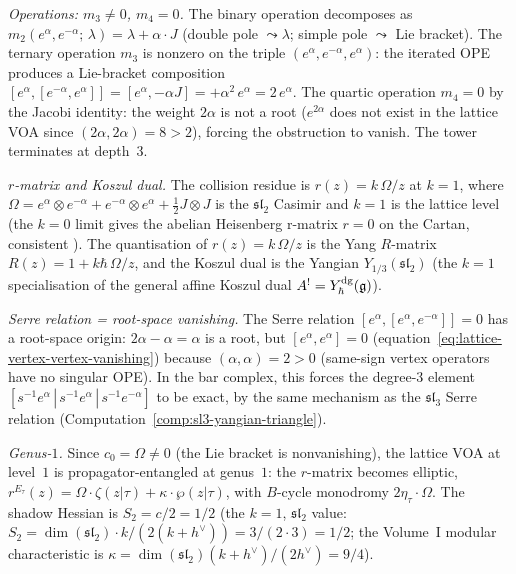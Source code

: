 \begin{computation}
\smallskip
\noindent
\emph{Operations: $m_3 \ne 0$, $m_4 = 0$.}
The binary operation decomposes as
$m_2(e^\alpha, e^{-\alpha};\, \lambda)
= \lambda + \alpha \cdot J$
(double pole $\leadsto \lambda$; simple pole $\leadsto$ Lie bracket).
The ternary operation $m_3$ is nonzero on the triple
$(e^\alpha, e^{-\alpha}, e^\alpha)$: the iterated OPE
produces a Lie-bracket composition
$[e^\alpha, [e^{-\alpha}, e^\alpha]] = [e^\alpha, -\alpha J]
= +\alpha^2\, e^\alpha = 2\, e^\alpha$.
The quartic operation $m_4 = 0$ by the Jacobi identity:
the weight $2\alpha$ is not a root
($e^{2\alpha}$ does not exist in the lattice VOA
since $(2\alpha, 2\alpha) = 8 > 2$), forcing the
obstruction to vanish. The tower terminates at depth~$3$.

\smallskip
\noindent
\emph{$r$-matrix and Koszul dual.}
The collision residue is
$r(z) = k\,\Omega/z$ at $k = 1$, where
$\Omega = e^\alpha \otimes e^{-\alpha}
+ e^{-\alpha} \otimes e^{\alpha}
+ \tfrac{1}{2} J \otimes J$
is the $\mathfrak{sl}_2$ Casimir and $k = 1$ is the
lattice level (the $k = 0$ limit gives the abelian
Heisenberg r-matrix $r = 0$ on the Cartan, consistent
).
The quantisation of $r(z) = k\,\Omega/z$ is the
Yang $R$-matrix $R(z) = 1 + k\hbar\,\Omega/z$,
and the Koszul dual is the Yangian
$Y_{1/3}(\mathfrak{sl}_2)$
(the $k = 1$ specialisation of the general affine
Koszul dual
$A^! = Y_\hbar^{\mathrm{dg}}(\mathfrak{g})$).

\smallskip
\noindent
\emph{Serre relation = root-space vanishing.}
The Serre relation $[e^\alpha, [e^\alpha, e^{-\alpha}]] = 0$
has a root-space origin: $2\alpha - \alpha = \alpha$ is a root,
but $[e^\alpha, e^\alpha] = 0$
(equation~\eqref{eq:lattice-vertex-vertex-vanishing})
because $(\alpha, \alpha) = 2 > 0$ (same-sign vertex
operators have no singular OPE). In the bar complex,
this forces the degree-$3$ element
$[s^{-1}e^\alpha\,|\,s^{-1}e^\alpha\,|\,s^{-1}e^{-\alpha}]$
to be exact, by the same mechanism as the $\mathfrak{sl}_3$
Serre relation
(Computation~\ref{comp:sl3-yangian-triangle}).

\smallskip
\noindent
\emph{Genus-$1$.}
Since $c_0 = \Omega \ne 0$ (the Lie bracket is
nonvanishing), the lattice VOA at level~$1$ is
propagator-entangled at genus~$1$: the $r$-matrix
becomes elliptic,
$r^{E_\tau}(z) = \Omega \cdot \zeta(z|\tau) + \kappa \cdot \wp(z|\tau)$,
with $B$-cycle monodromy $2\eta_\tau \cdot \Omega$.
The shadow Hessian is $S_2 = c/2 = 1/2$
(the $k = 1$, $\mathfrak{sl}_2$ value:
$S_2 = \dim(\mathfrak{sl}_2)\cdot k/(2(k+h^\vee)) = 3/(2 \cdot 3) = 1/2$;
the Volume~I modular characteristic is
$\kappa = \dim(\mathfrak{sl}_2)(k+h^\vee)/(2h^\vee) = 9/4$).
\end{computation}

